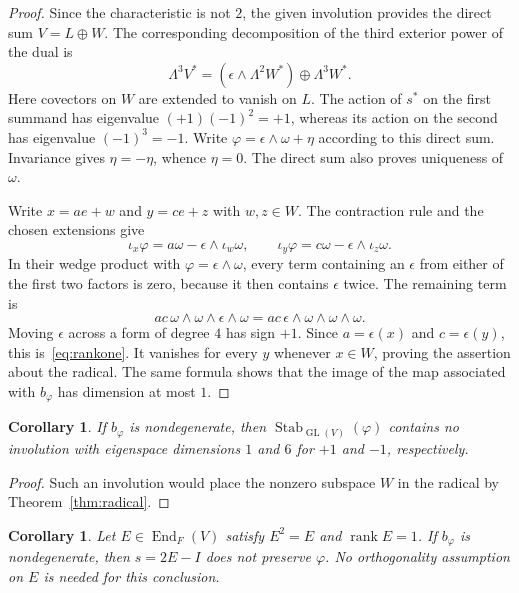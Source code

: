 \documentclass[11pt]{article}
\newtheorem{corollary}[theorem]{Corollary}
\newcommand{\Stab}{\operatorname{Stab}}
\begin{document}
\begin{proof}
Since the characteristic is not $2$, the given involution provides the direct
sum $V=L\oplus W$. The corresponding decomposition of the third exterior
power of the dual is
\[
 \Lambda^3V^*=(\epsilon\wedge\Lambda^2W^*)\oplus\Lambda^3W^*.
\]
Here covectors on $W$ are extended to vanish on $L$. The action of $s^*$ on
the first summand has eigenvalue $(+1)(-1)^2=+1$, whereas its action on the
second has eigenvalue $(-1)^3=-1$. Write
$\varphi=\epsilon\wedge\omega+\eta$ according to this direct sum. Invariance
gives $\eta=-\eta$, whence $\eta=0$. The direct sum also proves uniqueness
of $\omega$.

Write $x=ae+w$ and $y=ce+z$ with $w,z\in W$. The contraction rule and the
chosen extensions give
\[
 \iota_x\varphi=a\omega-\epsilon\wedge\iota_w\omega,
 \qquad
 \iota_y\varphi=c\omega-\epsilon\wedge\iota_z\omega.
\]
In their wedge product with $\varphi=\epsilon\wedge\omega$, every term
containing an $\epsilon$ from either of the first two factors is zero,
because it then contains $\epsilon$ twice. The remaining term is
\[
 ac\,\omega\wedge\omega\wedge\epsilon\wedge\omega
   =ac\,\epsilon\wedge\omega\wedge\omega\wedge\omega.
\]
Moving $\epsilon$ across a form of degree $4$ has sign $+1$. Since
$a=\epsilon(x)$ and $c=\epsilon(y)$, this is~\eqref{eq:rankone}. It vanishes
for every $y$ whenever $x\in W$, proving the assertion about the radical.
The same formula shows that the image of the map associated with
$b_\varphi$ has dimension at most $1$.
\end{proof}

\begin{corollary}\label{cor:noinvolution}
If $b_\varphi$ is nondegenerate, then $\Stab_{\operatorname{GL}(V)}(\varphi)$
contains no involution with eigenspace dimensions $1$ and $6$ for $+1$ and
$-1$, respectively.
\end{corollary}

\begin{proof}
Such an involution would place the nonzero subspace $W$ in the radical by
Theorem~\ref{thm:radical}.
\end{proof}

\begin{corollary}\label{cor:projector}
Let $E\in\operatorname{End}_F(V)$ satisfy $E^2=E$ and $\operatorname{rank}E=1$.
If $b_\varphi$ is nondegenerate, then $s=2E-I$ does not preserve $\varphi$.
No orthogonality assumption on $E$ is needed for this conclusion.
\end{corollary}
\end{document}
